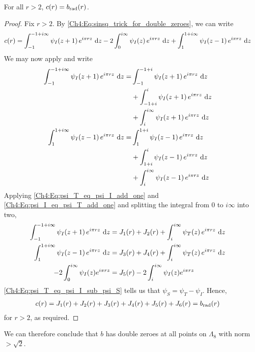 \begin{boxproposition}\label{Ch4:Prop:b_eq_c}
    For all $r > 2$, $c(r) = b_{\operatorname{rad}}(r)$.
\end{boxproposition}
\begin{proof}
    Fix $r > 2$. By \eqref{Ch4:Eq:sinsq_trick_for_double_zeroes}, we can write
    \begin{align*}
        c(r)
        = \int_{-1}^{-1 + i\infty} \psi_I\!\left( z + 1 \right) e^{i\pi r z} \, \operatorname{d}\!{z}
        - 2 \int_{0}^{i\infty} \psi_I\!\left( z \right) e^{i\pi r z} \, \operatorname{d}\!{z}
        + \int_{1}^{1 + i\infty} \psi_I\!\left( z - 1 \right) e^{i\pi r z} \, \operatorname{d}\!{z}
    \end{align*}
    We may now apply  and write
    \begin{align*}
        \int_{-1}^{-1 + i\infty} \psi_I\of{z + 1} e^{i\pi r z} \, \diff{z}
        =& \int_{-1}^{-1 + i} \psi_I\of{z + 1} e^{i\pi r z} \, \diff{z} \\
        &+ \int_{-1 + i}^{i} \psi_I\of{z + 1} e^{i\pi r z} \, \diff{z} \\
        &+ \int_{i}^{i\infty} \psi_I\of{z + 1} e^{i\pi r z} \, \diff{z} \\
        \int_{1}^{1 + i\infty} \psi_I\of{z - 1} e^{i\pi r z} \, \diff{z}
        =& \int_{1}^{1 + i}\psi_I\of{z - 1} e^{i\pi r z} \, \diff{z} \\
        &+ \int_{1 + i}^{i} \psi_I\of{z - 1} e^{i\pi r z} \, \diff{z} \\
        &+ \int_{i}^{i\infty}\psi_I\of{z - 1} e^{i\pi r z} \, \diff{z}
    \end{align*}
    Applying \eqref{Ch4:Eq:psi_T_eq_psi_I_add_one} and \eqref{Ch4:Eq:psi_I_eq_psi_T_add_one} and splitting the integral from $0$ to $i\infty$ into two,
    \begin{align*}
        \int_{-1}^{-1 + i\infty} \psi_I\of{z + 1} e^{i\pi r z} \, \diff{z}
        &= J_1(r) + J_2(r) + \int_{i}^{i\infty} \psi_T\of{z} e^{i\pi r z} \, \diff{z} \\
        \int_{1}^{1 + i\infty} \psi_I\of{z - 1} e^{i\pi r z} \, \diff{z}
        &= J_3(r) + J_4(r) + \int_{i}^{i\infty} \psi_T\of{z} e^{i\pi r z} \, \diff{z} \\
        -2\int_{0}^{i\infty} \psi_I(z) e^{i \pi r z} &= J_5(r) - 2\int_{i}^{i\infty} \psi_I(z) e^{i \pi r z}
    \end{align*}
    \eqref{Ch4:Eq:psi_T_eq_psi_I_sub_psi_S} tells us that $\psi_S = \psi_T - \psi_I$. Hence,
    \begin{align*}
        c(r) = J_1(r) + J_2(r) + J_3(r) + J_4(r) + J_5(r) + J_6(r) = b_{\operatorname{rad}}(r)
    \end{align*}
    for $r > 2$, as required.
\end{proof}

We can therefore conclude that $b$ has double zeroes at all points on $\Lambda_8$ with norm $> \sqrt{2}$.